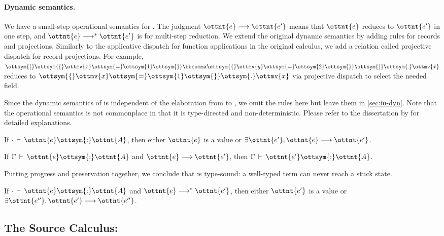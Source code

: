 \paragraph{Dynamic semantics.}
We have a small-step operational semantics for \lambdaiu. The judgment
$\ottnt{e}\longrightarrow\ottnt{e'}$ means that $\ottnt{e}$ reduces to $\ottnt{e'}$ in one step,
and $\ottnt{e}\longrightarrow^*\ottnt{e'}$ is for multi-step reduction. We extend the
original dynamic semantics by adding rules for records and projections.
Similarly to the applicative dispatch for function applications in the original
calculus, we add a relation called projective dispatch for record projections.
For example, $\ottsym{(}  \ottsym{\{}  \ottmv{x}  \ottsym{=}  \ottsym{1}  \ottsym{\}}  \bbcomma  \ottsym{\{}  \ottmv{y}  \ottsym{=}  \ottsym{2}  \ottsym{\}}  \ottsym{)}  \ottsym{.}  \ottmv{x}$ reduces to $\ottsym{\{}  \ottmv{x}  \ottsym{=}  \ottsym{1}  \ottsym{\}}  \ottsym{.}  \ottmv{x}$ via
projective dispatch to select the needed field.

Since the dynamic semantics of \lambdaiu is independent of the elaboration from
\uaena to \lambdaiu, we omit the rules here but leave them in
\autoref{sec:iu-dyn}. Note that the operational semantics is not commonplace in
that it is type-directed and non-deterministic. Please refer to the dissertation
by \citet{rehman2023blend} for detailed explanations.

\begin{theorem}[Progress]
  If $ \cdot   \,\vdash\,  \ottnt{e}  \ottsym{:}  \ottnt{A}$, then either $\ottnt{e}$ is a value or $\exists \ottnt{e'}, \ottnt{e} \longrightarrow \ottnt{e'}$.
\end{theorem}
\begin{theorem}[Preservation]
  If $\Gamma  \,\vdash\,  \ottnt{e}  \ottsym{:}  \ottnt{A}$ and $\ottnt{e} \longrightarrow \ottnt{e'}$, then $\Gamma  \,\vdash\,  \ottnt{e'}  \ottsym{:}  \ottnt{A}$.
\end{theorem}
Putting progress and preservation together, we conclude that \lambdaiu is type-sound:
a well-typed term can never reach a stuck state.
\begin{corollary}
  If $ \cdot   \,\vdash\,  \ottnt{e}  \ottsym{:}  \ottnt{A}$ and $\ottnt{e} \longrightarrow^* \ottnt{e'}$, then either $\ottnt{e'}$ is a value or $\exists \ottnt{e''}, \ottnt{e'} \longrightarrow \ottnt{e''}$.
\end{corollary}

\subsection{The Source Calculus: \uaena} \label{sec:uaena}

